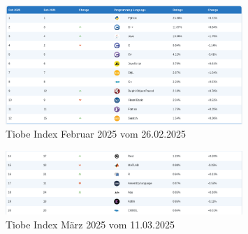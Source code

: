 \documentclass[11pt]{article}
\begin{document}
    \begin{figure}[h]
        \centering
        \includegraphics[width=0.8\textwidth]{pictures/Screenshot 2025-02-26 at 19-54-42 TIOBE Index - TIOBE}
        \caption{Tiobe Index Februar 2025 vom 26.02.2025}
        \label{fig:tiobe-java-2025}
    \end{figure}

    \begin{figure}[h]
        \centering
        \includegraphics[width=0.8\textwidth]{pictures/Screenshot 2025-03-11 at 22-21-04 TIOBE Index - TIOBE}
        \caption{Tiobe Index März 2025 vom 11.03.2025}
        \label{fig:tiobe-kotlin-2025}
    \end{figure}
\end{document}

